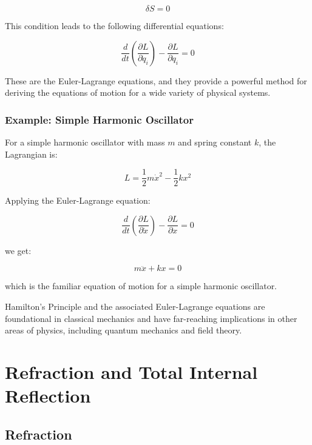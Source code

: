 \documentclass[
  a4paper,
]{book}
\begin{document}
\begin{tcolorbox}
\[
\delta S = 0
\]

This condition leads to the following differential equations:

\[
\frac{d}{dt} \left( \frac{\partial L}{\partial \dot{q}_i} \right) - \frac{\partial L}{\partial q_i} = 0
\]

These are the Euler-Lagrange equations, and they provide a powerful
method for deriving the equations of motion for a wide variety of
physical systems.

\subsection{Example: Simple Harmonic
Oscillator}\label{example-simple-harmonic-oscillator}

For a simple harmonic oscillator with mass \(m\) and spring constant
\(k\), the Lagrangian is:

\[
L = \frac{1}{2} m \dot{x}^2 - \frac{1}{2} k x^2
\]

Applying the Euler-Lagrange equation:

\[
\frac{d}{dt} \left( \frac{\partial L}{\partial \dot{x}} \right) - \frac{\partial L}{\partial x} = 0
\]

we get:

\[
m \ddot{x} + k x = 0
\]

which is the familiar equation of motion for a simple harmonic
oscillator.

Hamilton's Principle and the associated Euler-Lagrange equations are
foundational in classical mechanics and have far-reaching implications
in other areas of physics, including quantum mechanics and field theory.

\end{tcolorbox}

\chapter{Refraction and Total Internal
Reflection}\label{refraction-and-total-internal-reflection}

\section{Refraction}\label{refraction}
\end{document}
